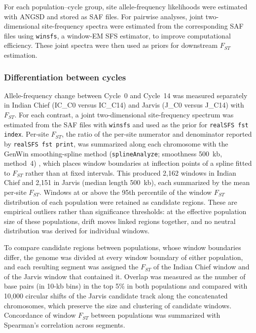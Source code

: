 For each population--cycle group, site allele-frequency likelihoods were estimated with ANGSD and stored as SAF files. For pairwise analyses, joint two-dimensional site-frequency spectra were estimated from the corresponding SAF files using \texttt{winsfs}, a window-EM SFS estimator, to improve computational efficiency. These joint spectra were then used as priors for downstream $F_{ST}$ estimation.

\subsubsection{Differentiation between cycles}

Allele-frequency change between Cycle~0 and Cycle~14 was measured separately in Indian Chief (IC\_C0 versus IC\_C14) and Jarvis (J\_C0 versus J\_C14) with $F_{ST}$. For each contrast, a joint two-dimensional site-frequency spectrum was estimated from the SAF files with \texttt{winsfs} \citep{Rasmussen2022winsfs} and used as the prior for \texttt{realSFS fst index}. Per-site $F_{ST}$, the ratio of the per-site numerator and denominator reported by \texttt{realSFS fst print}, was summarized along each chromosome with the GenWin smoothing-spline method (\texttt{splineAnalyze}; smoothness 500~kb, method~4) \citep{Beissinger2015GenWin}, which places window boundaries at inflection points of a spline fitted to $F_{ST}$ rather than at fixed intervals. This produced 2,162 windows in Indian Chief and 2,151 in Jarvis (median length 500~kb), each summarized by the mean per-site $F_{ST}$. Windows at or above the 95th percentile of the window $F_{ST}$ distribution of each population were retained as candidate regions. These are empirical outliers rather than significance thresholds: at the effective population size of these populations, drift moves linked regions together, and no neutral distribution was derived for individual windows.

To compare candidate regions between populations, whose window boundaries differ, the genome was divided at every window boundary of either population, and each resulting segment was assigned the $F_{ST}$ of the Indian Chief window and of the Jarvis window that contained it. Overlap was measured as the number of base pairs (in 10-kb bins) in the top 5\% in both populations and compared with 10,000 circular shifts of the Jarvis candidate track along the concatenated chromosomes, which preserve the size and clustering of candidate windows. Concordance of window $F_{ST}$ between populations was summarized with Spearman's correlation across segments.

